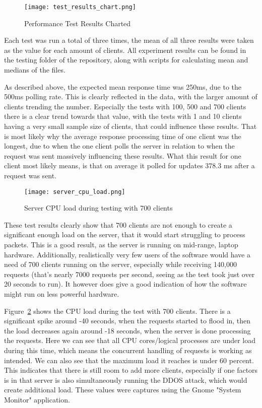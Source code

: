 \begin{figure}[h]
\caption{Performance Test Results Charted}
\texttt{[image: test\_results\_chart.png]}
\label{fig:test_results_chart}
\end{figure}

Each test was run a total of three times, the mean of all three results were taken as the value for each amount of clients. All experiment results can be found in the testing folder of the repository, along with scripts for calculating mean and medians of the files.

As described above, the expected mean response time was 250ms, due to the 500ms polling rate. This is clearly reflected in the data, with the larger amount of clients trending the number. Especially the tests with 100, 500 and 700 clients there is a clear trend towards that value, with the tests with 1 and 10 clients having a very small sample size of clients, that could influence these results. That is most likely why the average response processing time of one client was the longest, due to when the one client polls the server in relation to when the request was sent massively influencing these results. What this result for one client most likely means, is that on average it polled for updates 378.3 ms after a request was sent.

\begin{figure}[h]
\caption{Server CPU load during testing with 700 clients}
\texttt{[image: server\_cpu\_load.png]}
\label{fig:server_cpu_load}
\end{figure}

These test results clearly show that 700 clients are not enough to create a significant enough load on the server, that it would start struggling to process packets. This is a good result, as the server is running on mid-range, laptop hardware. Additionally, realistically very few users of the software would have a need of 700 clients running on the server, especially while receiving 140,000 requests (that's nearly 7000 requests per second, seeing as the test took just over 20 seconds to run). It however does give a good indication of how the software might run on less powerful hardware.

Figure~\ref{fig:server_cpu_load} shows the CPU load during the test with 700 clients. There is a significant spike around -40 seconds, when the requests started to flood in, then the load decreases again around -18 seconds, when the server is done processing the requests. Here we can see that all CPU cores/logical processes are under load during this time, which means the concurrent handling of requests is working as intended. We can also see that the maximum load it reaches is under 60 percent. This indicates that there is still room to add more clients, especially if one factors is in that server is also simultaneously running the DDOS attack, which would create additional load. These values were captures using the Gnome "System Monitor" application.

